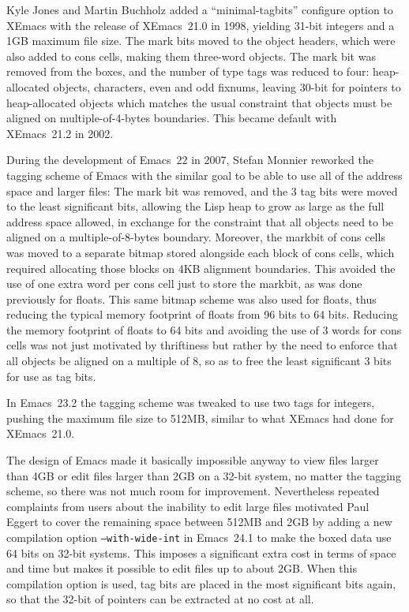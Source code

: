 \documentclass[format=acmsmall,screen]{acmart}
\begin{document}
Kyle Jones and Martin Buchholz added a ``minimal-tagbits'' configure option to XEmacs with the release
of XEmacs~21.0 in 1998, yielding 31-bit integers and a 1\;GB maximum
file size.  The mark bits moved to the object headers, which were also
added to cons cells, making them three-word objects.
The mark bit was removed from the boxes, and the number of
type tags was reduced to four: heap-allocated objects,
characters, even and odd fixnums, leaving 30-bit for pointers to
heap-allocated objects which matches the usual constraint that objects must be
aligned on multiple-of-4-bytes boundaries.  This became default with
XEmacs~21.2
in 2002.

During the development of Emacs~22 in 2007, Stefan Monnier reworked the
tagging scheme of Emacs with the similar goal to be able to use all of the
address space and larger files: The mark bit was removed, and the 3 tag bits
were moved to the least significant bits, allowing the Lisp heap to grow as
large as the full address space allowed, in exchange for the constraint that
all objects need to be aligned on a multiple-of-8-bytes boundary.  Moreover, the
markbit of cons cells was moved to a separate bitmap stored alongside
each block of cons cells, which required allocating those blocks on 4\;KB
alignment boundaries.  This avoided the use of one extra word per cons cell
just to store the markbit, as was done previously for floats.  This same
bitmap scheme was also used for floats, thus reducing the typical
memory footprint of floats from 96 bits to 64 bits.  Reducing the memory
footprint of floats to 64 bits and avoiding the use of 3 words for cons
cells was not just motivated by thriftiness but rather by the need to
enforce that all objects be aligned on a multiple of 8, so as to free the
least significant 3 bits for use as tag bits.

In Emacs~23.2 the tagging scheme was tweaked to use two tags for integers,
pushing the maximum file size to 512\;MB, similar to what XEmacs had
done for XEmacs~21.0.

The design of Emacs made it basically
impossible anyway to view files larger than 4\;GB or edit files larger than 2\;GB on
a 32-bit system, no matter the tagging scheme, so there was
not much room for improvement.
Nevertheless repeated complaints from users about the inability to edit
large files motivated Paul Eggert to cover the remaining space between
512\;MB and 2\;GB by adding a new compilation option
\texttt{--with-wide-int} in Emacs~24.1 to make the boxed data
use 64 bits on 32-bit systems.  This imposes a significant extra cost in terms
of space and time but makes it possible to edit files up to about 2\;GB.
When this compilation option is used, tag bits are placed in the most
significant bits again, so that the 32-bit of pointers can be extracted at no
cost at all.
\end{document}
